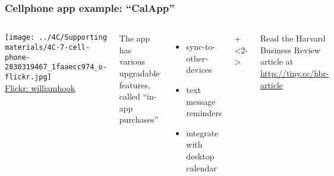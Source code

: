 \begin{frame}\frametitle{Cellphone app example: ``CalApp''}	
	\begin{columns}[T]
			\texttt{[image: ../4C/Supporting materials/4C-7-cell-phone-2830319467\_1faaecc974\_o-flickr.jpg]}
			\\
			\tiny{\href{https://secure.flickr.com/photos/williamhook/2830319467/}{Flickr: williamhook}}
			
		
			The app has various upgradable features, called ``in-app purchases''
			
			\begin{itemize}
				\item	sync-to-other-devices
				\item	text message reminders
				\item	integrate with desktop calendar
			\end{itemize}
			
			\vspace{1cm}
			
			
		\onslide+<2->{	
		}
		
		\vspace{0.5cm}
		{\scriptsize Read the Harvard Business Review article at \href{http://tiny.cc/hbr-article}{http://tiny.cc/hbr-article}}
		 
	\end{columns}	
\end{frame}

